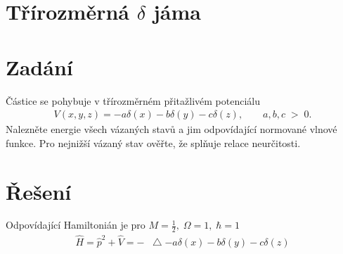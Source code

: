 \documentclass[10pt,a4paper]{article}
\newcommand*\Laplace{\mathop{}\!\mathbin\bigtriangleup}
\begin{document}
\section{Třírozměrná \texorpdfstring{$\delta$}{δ} jáma}

\section{Zadání}
Částice se pohybuje v třírozměrném přitažlivém potenciálu
\begin{align*}
    V(x,y,z) = - a \delta(x) - b \delta(y) - c \delta(z),
    \hspace{2em}
    a,b,c \; > \; 0.
\end{align*}
Nalezněte energie všech vázaných stavů a jim odpovídající normované vlnové funkce. Pro nejnižší vázaný stav ověřte, že splňuje relace neurčitosti.

\section{Řešení}
Odpovídající Hamiltonián je pro $M = \frac{1}{2}, \; \Omega = 1, \; \hbar = 1$
\begin{align*}
    \hat{H} = \hat{p}^2 + \hat{V} = -\Laplace - a \delta(x) - b \delta(y) - c \delta(z)
\end{align*}
\end{document}
